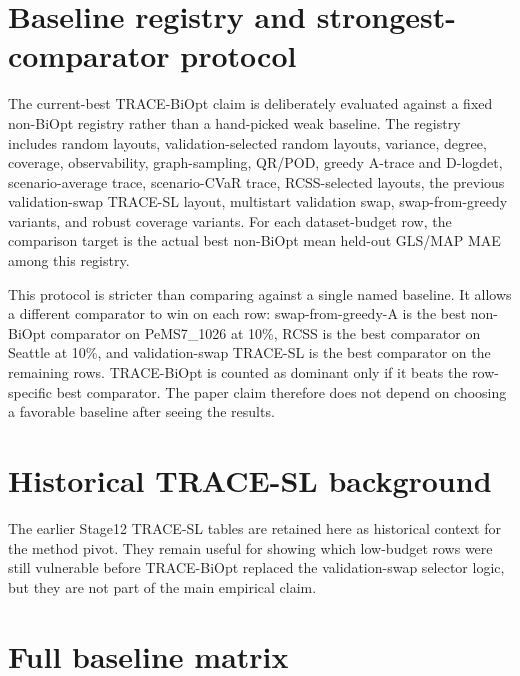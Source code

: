 \FloatBarrier
\section{Baseline registry and strongest-comparator protocol}

The current-best TRACE-BiOpt claim is deliberately evaluated against a fixed non-BiOpt registry
rather than a hand-picked weak baseline. The registry includes random layouts,
validation-selected random layouts, variance, degree, coverage, observability,
graph-sampling, QR/POD, greedy A-trace and D-logdet, scenario-average trace,
scenario-CVaR trace, RCSS-selected layouts, the previous validation-swap
TRACE-SL layout, multistart validation swap, swap-from-greedy variants, and
robust coverage variants. For each dataset-budget row, the comparison target is
the actual best non-BiOpt mean held-out GLS/MAP MAE among this registry.

This protocol is stricter than comparing against a single named baseline. It
allows a different comparator to win on each row: swap-from-greedy-A is the
best non-BiOpt comparator on PeMS7\_1026 at 10\%, RCSS is the best comparator
on Seattle at 10\%, and validation-swap TRACE-SL is the best comparator on the
remaining rows. TRACE-BiOpt is counted as dominant only if it beats the
row-specific best comparator. The paper claim therefore does not depend on
choosing a favorable baseline after seeing the results.





\FloatBarrier
\section{Historical TRACE-SL background}

The earlier Stage12 TRACE-SL tables are retained here as historical context for
the method pivot. They remain useful for showing which low-budget rows were
still vulnerable before TRACE-BiOpt replaced the validation-swap selector
logic, but they are not part of the main empirical claim.



\FloatBarrier
\section{Full baseline matrix}
\label{sec:appendix-full-baseline}


